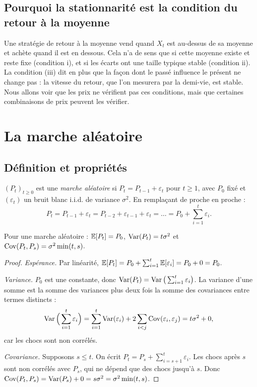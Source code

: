 \documentclass[11pt,a4paper]{article}
\begin{document}
\subsection{Pourquoi la stationnarité est la condition du retour à la moyenne}

Une stratégie de retour à la moyenne vend quand $X_t$ est \og au-dessus de sa moyenne\fg{} et achète quand il est en dessous. Cela n'a de sens que si cette moyenne existe et reste fixe (condition i), et si les écarts ont une taille typique stable (condition ii). La condition (iii) dit en plus que la façon dont le passé influence le présent ne change pas : la \og vitesse\fg{} du retour, que l'on mesurera par la demi-vie, est stable. Nous allons voir que les prix ne vérifient pas ces conditions, mais que certaines combinaisons de prix peuvent les vérifier.

\section{La marche aléatoire}

\subsection{Définition et propriétés}

\begin{definition}
$(P_t)_{t\ge0}$ est une \emph{marche aléatoire} si $P_t = P_{t-1} + \varepsilon_t$ pour $t \ge 1$, avec $P_0$ fixé et $(\varepsilon_t)$ un bruit blanc i.i.d. de variance $\sigma^2$. En remplaçant de proche en proche :
\[
P_t = P_{t-1} + \varepsilon_t = P_{t-2} + \varepsilon_{t-1} + \varepsilon_t = \dots = P_0 + \sum_{i=1}^{t}\varepsilon_i.
\]
\end{definition}

\begin{proposition}\label{prop:rw}
Pour une marche aléatoire : $\mathbb{E}[P_t] = P_0$, $\operatorname{Var}(P_t) = t\sigma^2$ et $\operatorname{Cov}(P_t,P_s) = \sigma^2\min(t,s)$.
\end{proposition}
\begin{proof}
\emph{Espérance.} Par linéarité, $\mathbb{E}[P_t] = P_0 + \sum_{i=1}^t \mathbb{E}[\varepsilon_i] = P_0 + 0 = P_0$.

\emph{Variance.} $P_0$ est une constante, donc $\operatorname{Var}(P_t) = \operatorname{Var}\big(\sum_{i=1}^t\varepsilon_i\big)$. La variance d'une somme est la somme des variances plus deux fois la somme des covariances entre termes distincts :
\[
\operatorname{Var}\Big(\sum_{i=1}^t\varepsilon_i\Big) = \sum_{i=1}^t\operatorname{Var}(\varepsilon_i) + 2\sum_{i<j}\operatorname{Cov}(\varepsilon_i,\varepsilon_j) = t\sigma^2 + 0,
\]
car les chocs sont non corrélés.

\emph{Covariance.} Supposons $s \le t$. On écrit $P_t = P_s + \sum_{i=s+1}^t\varepsilon_i$. Les chocs après $s$ sont non corrélés avec $P_s$, qui ne dépend que des chocs jusqu'à $s$. Donc $\operatorname{Cov}(P_t,P_s) = \operatorname{Var}(P_s) + 0 = s\sigma^2 = \sigma^2\min(t,s)$.
\end{proof}
\end{document}
